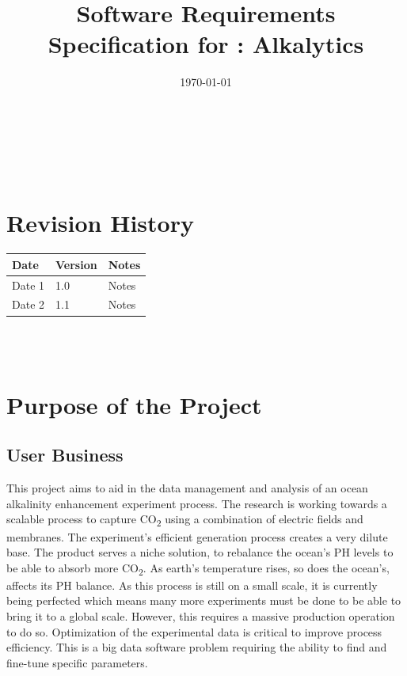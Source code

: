 \documentclass[12pt]{article}
\begin{document}
\title{Software Requirements Specification for \progname: Alkalytics} 
\author{\authname}
\date{\today}
	
\maketitle

~\newpage


\tableofcontents

~\newpage

\section*{Revision History}

\begin{tabularx}{\textwidth}{p{3cm}p{2cm}X} \toprule {\textbf{Date}} &
{\textbf{Version}} & {\textbf{Notes}}\\
\midrule
Date 1 & 1.0 & Notes\\
Date 2 & 1.1 & Notes\\
\bottomrule
\end{tabularx}

~\\

~\newpage
\section{Purpose of the Project}
\subsection{User Business}
This project aims to aid in the data management and analysis of an ocean
alkalinity enhancement experiment process. The research is working towards a
scalable process to capture CO\textsubscript{2} using a combination of electric
fields and membranes. The experiment's efficient generation process creates a
very dilute base. The product serves a niche solution, to rebalance the ocean's
PH levels to be able to absorb more CO\textsubscript{2}. As earth’s temperature
rises, so does the ocean’s, affects its PH balance. As this process is still on
a small scale, it is currently being perfected which means many more experiments
must be done to be able to bring it to a global scale. However, this requires a
massive production operation to do so. Optimization of the experimental data is
critical to improve process efficiency. This is a big data software problem
requiring the ability to find and fine-tune specific parameters. 
\end{document}
